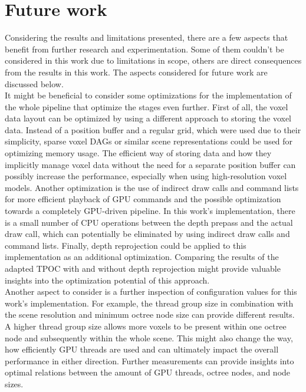 \chapter{Future work} \label{cpt-future-work}

Considering the results and limitations presented, there are a few aspects that benefit from further 
research and experimentation. Some of them couldn't be considered in this work due to limitations in 
scope, others are direct consequences from the results in this work. The aspects considered for 
future work are discussed below. \\

\noindent
It might be beneficial to consider some optimizations for the implementation of the whole pipeline that 
optimize the stages even further. First of all, the voxel data layout can be optimized by using a different
approach to storing the voxel data. Instead of a position buffer and a regular grid, which were used due to 
their simplicity, sparse voxel \ac{DAG}s or similar scene representations could be used for optimizing 
memory usage. The efficient way of storing data and how they implicitly manage voxel data without the 
need for a separate position buffer can possibly increase the performance, especially when using 
high-resolution voxel models. Another optimization is the use of indirect draw calls and command lists 
for more efficient playback of \ac{GPU} commands and the possible optimization towards a completely 
\ac{GPU}-driven pipeline. In this work's implementation, there is a small number of \ac{CPU} operations 
between the depth prepass and the actual draw call, which can potentially be eliminated by using indirect 
draw calls and command lists. Finally, depth reprojection could be applied to this implementation as an 
additional optimization. Comparing the results of the adapted \ac{TPOC} with and without depth reprojection 
might provide valuable insights into the optimization potential of this approach. \\

\noindent
Another aspect to consider is a further inspection of configuration values for this work's implementation. 
For example, the thread group size in combination with the scene resolution and minimum octree node size 
can provide different results. A higher thread group size allows more voxels to be present within one octree 
node and subsequently within the whole scene. This might also change the way, how efficiently \ac{GPU} 
threads are used and can ultimately impact the overall performance in either direction. Further measurements 
can provide insights into optimal relations between the amount of \ac{GPU} threads, octree nodes, and node 
sizes. \\

